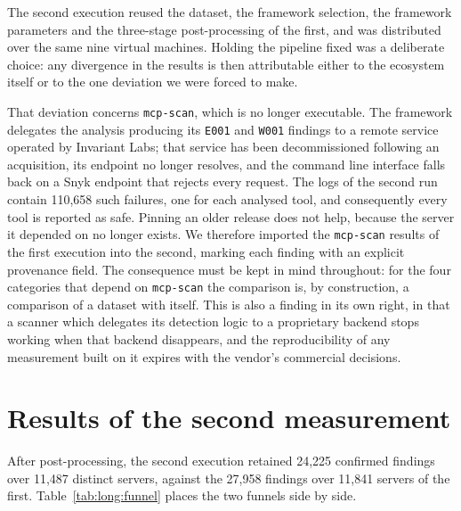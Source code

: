 The second execution reused the dataset, the framework selection, the framework
parameters and the three-stage post-processing of the first, and was distributed
over the same nine virtual machines. Holding the pipeline fixed was a deliberate
choice: any divergence in the results is then attributable either to the
ecosystem itself or to the one deviation we were forced to make.

That deviation concerns \texttt{mcp-scan}, which is no longer executable. The
framework delegates the analysis producing its \texttt{E001} and \texttt{W001}
findings to a remote service operated by Invariant Labs; that service has been
decommissioned following an acquisition, its endpoint no longer resolves, and
the command line interface falls back on a Snyk endpoint that rejects every
request. The logs of the second run contain 110,658 such failures, one for each
analysed tool, and consequently every tool is reported as safe. Pinning an older
release does not help, because the server it depended on no longer exists. We
therefore imported the \texttt{mcp-scan} results of the first execution into the
second, marking each finding with an explicit provenance field. The consequence
must be kept in mind throughout: for the four categories that depend on
\texttt{mcp-scan} the comparison is, by construction, a comparison of a dataset
with itself. This is also a finding in its own right, in that a scanner which
delegates its detection logic to a proprietary backend stops working when that
backend disappears, and the reproducibility of any measurement built on it
expires with the vendor's commercial decisions.

\section{Results of the second measurement}
\label{sec:long:results}

After post-processing, the second execution retained 24,225 confirmed findings
over 11,487 distinct servers, against the 27,958 findings over 11,841 servers of
the first. Table~\ref{tab:long:funnel} places the two funnels side by side.

